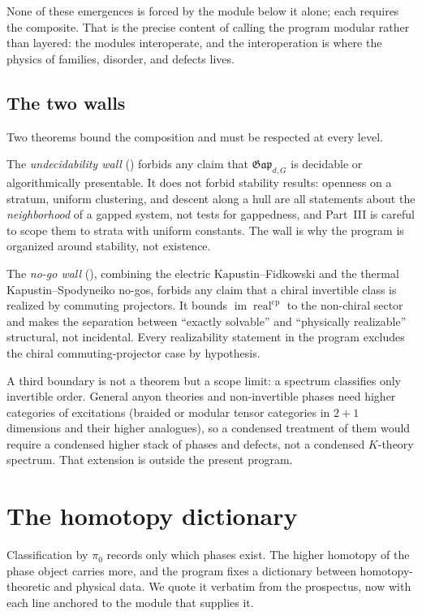 \documentclass[12pt]{article}
\newcommand{\Gap}{\mathfrak{Gap}}              %
\newcommand{\real}{\operatorname{real}}        %
\newcommand{\CPr}{\mathrm{cp}}                  %
\newcommand{\im}{\operatorname{im}}
\theoremstyle{plain}
\theoremstyle{definition}
\theoremstyle{remark}
\begin{document}
None of these emergences is forced by the module below it alone; each requires the
composite. That is the precise content of calling the program modular rather than
layered: the modules interoperate, and the interoperation is where the physics of
families, disorder, and defects lives.

\subsection{The two walls}
\label{sec:walls}

Two theorems bound the composition and must be respected at every level.

The \emph{undecidability wall} () forbids any claim that $\Gap_{d,G}$ is
decidable or algorithmically presentable. It does not forbid stability results: openness
on a stratum, uniform clustering, and descent along a hull are all statements about the
\emph{neighborhood} of a gapped system, not tests for gappedness, and Part~III is careful
to scope them to strata with uniform constants. The wall is why the program is organized
around stability, not existence.

The \emph{no-go wall} (), combining the electric Kapustin--Fidkowski and the
thermal Kapustin--Spodyneiko no-gos, forbids any claim that a chiral invertible class is
realized by commuting projectors. It bounds $\im\real^{\CPr}$ to the non-chiral sector and
makes the separation between ``exactly solvable'' and ``physically realizable''
structural, not incidental. Every realizability statement in the program excludes the
chiral commuting-projector case by hypothesis.

A third boundary is not a theorem but a scope limit: a spectrum classifies only
invertible order. General anyon theories and non-invertible phases need higher categories
of excitations (braided or modular tensor categories in $2{+}1$ dimensions and their
higher analogues), so a condensed treatment of them would require a condensed higher stack
of phases and defects, not a condensed $K$-theory spectrum. That extension is outside the
present program.

\section{The homotopy dictionary}
\label{sec:dictionary}

Classification by $\pi_0$ records only which phases exist. The higher homotopy of the
phase object carries more, and the program fixes a dictionary between homotopy-theoretic
and physical data. We quote it verbatim from the prospectus, now with each line anchored
to the module that supplies it.
\end{document}

